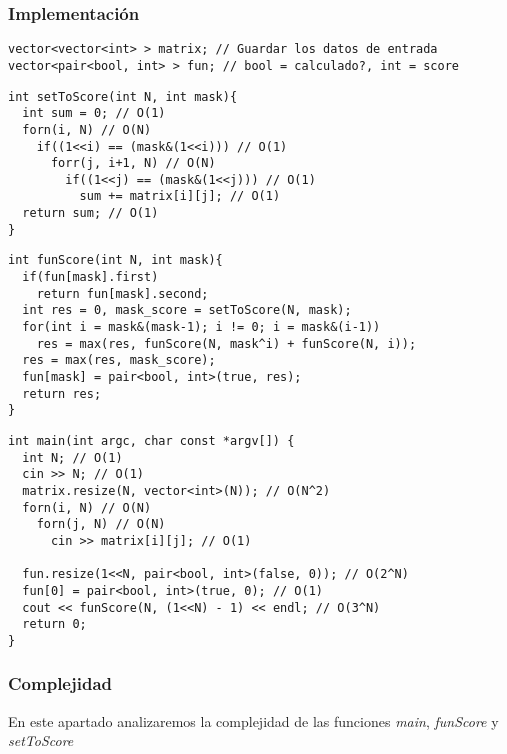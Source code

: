 \subsubsection{Implementación}

\begin{verbatim}
vector<vector<int> > matrix; // Guardar los datos de entrada
vector<pair<bool, int> > fun; // bool = calculado?, int = score
\end{verbatim}

\begin{verbatim}
int setToScore(int N, int mask){
  int sum = 0; // O(1)
  forn(i, N) // O(N)
    if((1<<i) == (mask&(1<<i))) // O(1)
      forr(j, i+1, N) // O(N)
        if((1<<j) == (mask&(1<<j))) // O(1)
          sum += matrix[i][j]; // O(1)
  return sum; // O(1)
}
\end{verbatim}

\begin{verbatim}
int funScore(int N, int mask){
  if(fun[mask].first)
    return fun[mask].second;
  int res = 0, mask_score = setToScore(N, mask);
  for(int i = mask&(mask-1); i != 0; i = mask&(i-1))
    res = max(res, funScore(N, mask^i) + funScore(N, i));
  res = max(res, mask_score);
  fun[mask] = pair<bool, int>(true, res);
  return res;
}
\end{verbatim}

\begin{verbatim}
int main(int argc, char const *argv[]) {
  int N; // O(1)
  cin >> N; // O(1)
  matrix.resize(N, vector<int>(N)); // O(N^2)
  forn(i, N) // O(N)
    forn(j, N) // O(N)
      cin >> matrix[i][j]; // O(1)

  fun.resize(1<<N, pair<bool, int>(false, 0)); // O(2^N)
  fun[0] = pair<bool, int>(true, 0); // O(1)
  cout << funScore(N, (1<<N) - 1) << endl; // O(3^N)
  return 0;
}
\end{verbatim}

\subsubsection{Complejidad}

En este apartado analizaremos la complejidad de las funciones \textit{main}, \textit{funScore} y \textit{setToScore}

